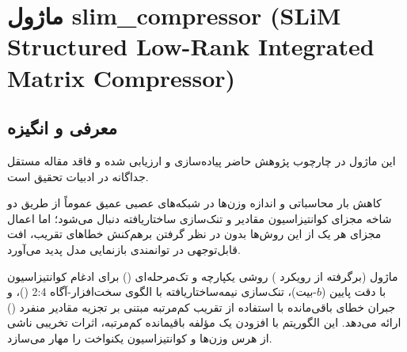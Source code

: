 \section{ماژول slim\_compressor (SLiM Structured Low-Rank Integrated Matrix Compressor)}
\label{sec:module_slim_compressor}

\subsection{معرفی و انگیزه}
این ماژول در چارچوب پژوهش حاضر پیاده‌سازی و ارزیابی شده و فاقد مقاله مستقل جداگانه در ادبیات تحقیق است.

کاهش بار محاسباتی و اندازه وزن‌ها در شبکه‌های عصبی عمیق عموماً از طریق دو شاخه مجزای کوانتیزاسیون مقادیر و تنک‌سازی ساختاریافته دنبال می‌شود؛ اما اعمال مجزای هر یک از این روش‌ها بدون در نظر گرفتن برهم‌کنش خطاهای تقریب، افت قابل‌توجهی در توانمندی بازنمایی مدل پدید می‌آورد. 

ماژول  (برگرفته از رویکرد ) روشی یکپارچه و تک‌مرحله‌ای () برای ادغام کوانتیزاسیون با دقت پایین ($b$-بیت)، تنک‌سازی نیمه‌ساختاریافته با الگوی سخت‌افزار-آگاه 2:4 ()، و جبران خطای باقی‌مانده با استفاده از تقریب کم‌مرتبه مبتنی بر تجزیه مقادیر منفرد () ارائه می‌دهد. این الگوریتم با افزودن یک مؤلفه باقیمانده کم‌مرتبه، اثرات تخریبی ناشی از هرس وزن‌ها و کوانتیزاسیون یکنواخت را مهار می‌سازد.

